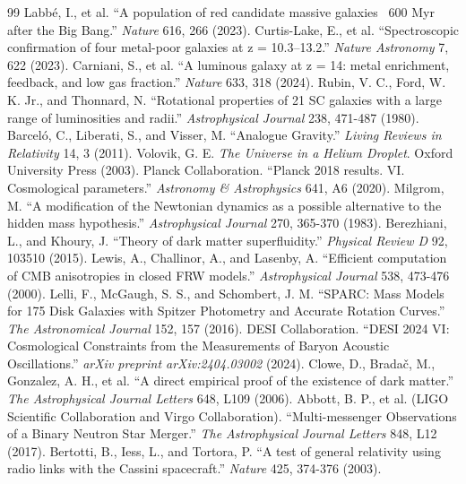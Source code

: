 \documentclass[aps,prd,10pt,twocolumn,superscriptaddress,nofootinbib]{revtex4-2}
\begin{document}
\begin{thebibliography}{99}
 Labbé, I., et al. ``A population of red candidate massive galaxies ~600 Myr after the Big Bang.'' \textit{Nature} 616, 266 (2023).
 Curtis-Lake, E., et al. ``Spectroscopic confirmation of four metal-poor galaxies at z = 10.3–13.2.'' \textit{Nature Astronomy} 7, 622 (2023).
 Carniani, S., et al. ``A luminous galaxy at z = 14: metal enrichment, feedback, and low gas fraction.'' \textit{Nature} 633, 318 (2024).
 Rubin, V. C., Ford, W. K. Jr., and Thonnard, N. ``Rotational properties of 21 SC galaxies with a large range of luminosities and radii.'' \textit{Astrophysical Journal} 238, 471-487 (1980).
 Barceló, C., Liberati, S., and Visser, M. ``Analogue Gravity.'' \textit{Living Reviews in Relativity} 14, 3 (2011).
 Volovik, G. E. \textit{The Universe in a Helium Droplet}. Oxford University Press (2003).
 Planck Collaboration. ``Planck 2018 results. VI. Cosmological parameters.'' \textit{Astronomy \& Astrophysics} 641, A6 (2020).
 Milgrom, M. ``A modification of the Newtonian dynamics as a possible alternative to the hidden mass hypothesis.'' \textit{Astrophysical Journal} 270, 365-370 (1983).
 Berezhiani, L., and Khoury, J. ``Theory of dark matter superfluidity.'' \textit{Physical Review D} 92, 103510 (2015).
 Lewis, A., Challinor, A., and Lasenby, A. ``Efficient computation of CMB anisotropies in closed FRW models.'' \textit{Astrophysical Journal} 538, 473-476 (2000).
 Lelli, F., McGaugh, S. S., and Schombert, J. M. ``SPARC: Mass Models for 175 Disk Galaxies with Spitzer Photometry and Accurate Rotation Curves.'' \textit{The Astronomical Journal} 152, 157 (2016).
 DESI Collaboration. ``DESI 2024 VI: Cosmological Constraints from the Measurements of Baryon Acoustic Oscillations.'' \textit{arXiv preprint arXiv:2404.03002} (2024).
 Clowe, D., Bradač, M., Gonzalez, A. H., et al. ``A direct empirical proof of the existence of dark matter.'' \textit{The Astrophysical Journal Letters} 648, L109 (2006).
 Abbott, B. P., et al. (LIGO Scientific Collaboration and Virgo Collaboration). ``Multi-messenger Observations of a Binary Neutron Star Merger.'' \textit{The Astrophysical Journal Letters} 848, L12 (2017).
 Bertotti, B., Iess, L., and Tortora, P. ``A test of general relativity using radio links with the Cassini spacecraft.'' \textit{Nature} 425, 374-376 (2003).

\end{thebibliography}
\end{document}
